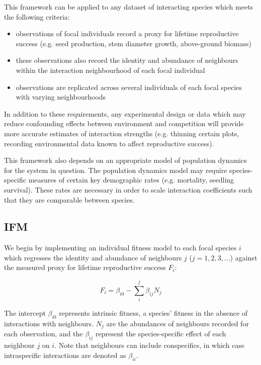 \documentclass[a4,12pt]{article}
\begin{document}
    This framework can be applied to any dataset of interacting species which meets the following criteria: 
    \begin{itemize}
        \item observations of focal individuals record a proxy for lifetime reproductive success (e.g. seed production, stem diameter growth, above-ground biomass)
        \item these observations also record the identity and abundance of neighbours within the interaction neighbourhood of each focal individual
        \item observations are replicated across several individuals of each focal species with varying neighbourhoods
    \end{itemize}
    In addition to these requirements, any experimental design or data which may reduce confounding effects between environment and competition will provide more accurate estimates of interaction strengths (e.g. thinning certain plots, recording environmental data known to affect reproductive success). 
    
    
    This framework also depends on an appropriate model of population dynamics for the system in question. The population dynamics model may require species-specific measures of certain key demographic rates (e.g. mortality, seedling survival). These rates are necessary in order to scale interaction coefficients such that they are comparable between species. 
    
    
        \subsection{IFM}
        
        We begin by implementing an individual fitness model to each focal species $i$ which regresses the identity and abundance of neighbours $j$ ($j = 1, 2, 3, ...$) against the measured proxy for lifetime reproductive success $F_{i}$:
        
        \begin{equation}
        F_{i} = \beta_{i0} - \sum_{i}^{j} \beta_{ij} N_{j}
        \label{ifm}
        \end{equation}
        
        The intercept $\beta_{i0}$ represents intrinsic fitness, a species' fitness in the absence of interactions with neighbours. $N_{j}$ are the abundances of neighbours recorded for each observation, and the $\beta_{ij}$ represent the species-specific effect of each neighbour $j$ on $i$. Note that neighbours can include conspecifics, in which case intraspecific interactions are denoted as $\beta_{ii}$.
        
\end{document}
